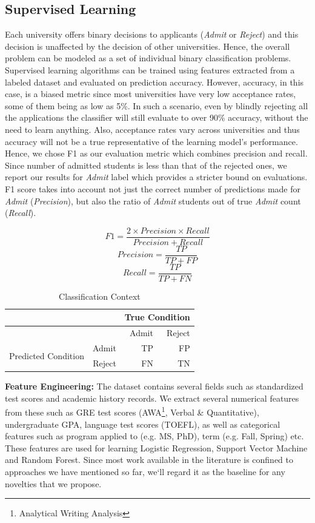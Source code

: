 \documentclass{sig-alternate-05-2015}
\begin{document}
\subsection{Supervised Learning}
\label{subsec:supervised-learning}
Each university offers binary decisions to applicants (\textit{Admit} or \textit{Reject}) and this decision is unaffected by the decision of other universities. Hence, the overall problem can be modeled as a set of individual binary classification problems. Supervised learning algorithms can be trained using features extracted from a labeled dataset and evaluated on prediction accuracy. However, accuracy, in this case, is a biased metric since most universities have very low acceptance rates, some of them being as low as 5\%. In such a scenario, even by blindly rejecting all the applications the classifier will still evaluate to over 90\% accuracy, without the need to learn anything. Also, acceptance rates vary across universities and thus accuracy will not be a true representative of the learning model's performance. Hence, we chose F1 as our evaluation metric which combines precision and recall. Since number of admitted students is less than that of the rejected ones, we report our results for \textit{Admit} label which provides a stricter bound on evaluations. F1 score takes into account not just the correct number of predictions made for \textit{Admit} (\textit{Precision}), but also the ratio of \textit{Admit} students out of true \textit{Admit} count (\textit{Recall}).

$$F1 = \frac{2 \times Precision \times Recall}{Precision + Recall}$$
$$Precision = \frac{TP}{TP + FP}$$
$$Recall = \frac{TP}{TP + FN}$$

\begin{table}[]
\centering
\caption{Classification Context}
\label{tab:classification-context}
\begin{tabular}{|l|r|r|r|}
\hline
                  &  & \multicolumn{2}{r|}{True Condition} \\ \hline
                  &  &  Admit         & Reject          \\ \hline
\multirow{2}{*}{Predicted Condition} & Admit &  TP         & FP          \\ \cline{2-4} 
                  & Reject & FN          & TN          \\ \hline
\end{tabular}
\end{table}

\textbf{Feature Engineering:}
The dataset contains several fields such as standardized test scores and academic history records. We extract several numerical features from these such as GRE test scores (AWA\footnote{Analytical Writing Analysis}, Verbal \& Quantitative), undergraduate GPA, language test scores (TOEFL), as well as categorical features such as program applied to (e.g. MS, PhD), term (e.g. Fall, Spring) etc. These features are used for learning Logistic Regression, Support Vector Machine and Random Forest. Since most work available in the literature is confined to approaches we have mentioned so far, we`ll regard it as the baseline for any novelties that we propose.
\end{document}
